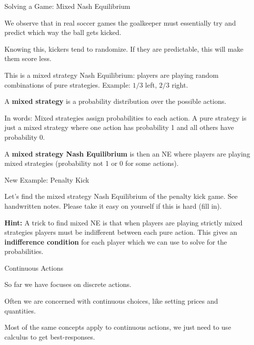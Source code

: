 \documentclass[aspectratio=169]{beamer}
\newenvironment{wideitemize}{\itemize\addtolength{\itemsep}{10pt}}{\enditemize}
\begin{document}
\begin{frame}{Solving a Game: Mixed Nash Equilibrium}
\begin{wideitemize}
    \item We observe that in real soccer games the goalkeeper must essentially try and predict which way the ball gets kicked.
    \item Knowing this, kickers tend to randomize. If they are predictable, this will make them score less.
    \item This is a mixed strategy Nash Equilibrium: players are playing random combinations of pure strategies. Example: $1/3$ left, $2/3$ right.
    \begin{definition}
    A \textbf{mixed strategy} is a probability distribution over the possible actions.
    \end{definition}
    \item In words: Mixed strategies assign probabilities to each action. A pure strategy is just a mixed strategy where one action has probability 1 and all others have probability 0.
    \item A \textbf{mixed strategy Nash Equilibrium} is then an NE where players are playing mixed strategies (probability not 1 or 0 for some actions). 
\end{wideitemize}
\end{frame}

\begin{frame}{New Example: Penalty Kick}

Let's find the mixed strategy Nash Equilibrium of the penalty kick game. See handwritten notes. Please take it easy on yourself if this is hard (fill in).

\vspace{5cm}

\textbf{Hint:} A trick to find mixed NE is that when players are playing strictly mixed strategies players must be indifferent between each pure action. This gives an \textbf{indifference condition} for each player which we can use to solve for the probabilities.
\end{frame}


\begin{frame}{Continuous Actions}

\begin{wideitemize}
    \item So far we have focuses on discrete actions.
    \item Often we are concerned with continuous choices, like setting prices and quantities.
    \item Most of the same concepts apply to continuous actions, we just need to use calculus to get best-responses.
\end{wideitemize}
    
\end{frame}
\end{document}
